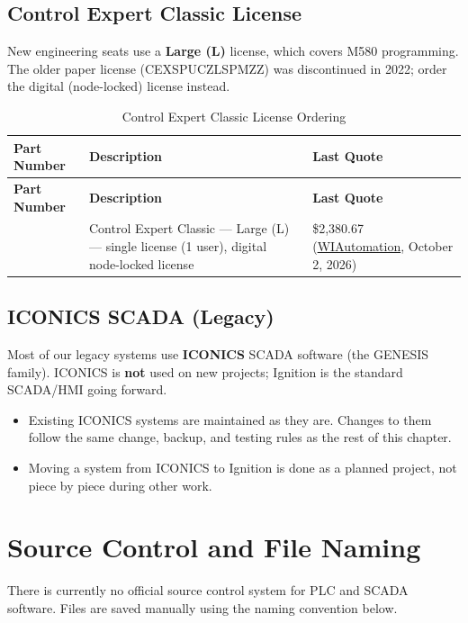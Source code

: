 \subsection{Control Expert Classic License}
New engineering seats use a \textbf{Large (L)} license, which covers M580 programming. The older paper license (CEXSPUCZLSPMZZ) was discontinued in 2022; order the digital (node-locked) license instead.
\begin{longtable}{@{}P{3.90cm}P{8.89cm}P{4.12cm}@{}}
\caption{Control Expert Classic License Ordering}\label{tab:ce-license} \\
\toprule
{}\textbf{Part Number} & \textbf{Description} & \textbf{Last Quote} \\
\midrule
\endfirsthead
\toprule
{}\textbf{Part Number} & \textbf{Description} & \textbf{Last Quote} \\
\midrule
\endhead
{} & Control Expert Classic --- Large (L) --- single license (1 user), digital node-locked license & \$2,380.67 (\href{https://us.wiautomation.com/}{WIAutomation}, October 2, 2026) \\
\bottomrule
\end{longtable}

\subsection{ICONICS SCADA (Legacy)}\label{sec:iconics}
Most of our legacy systems use \textbf{ICONICS} SCADA software (the GENESIS family). ICONICS is \textbf{not} used on new projects; Ignition is the standard SCADA/HMI going forward.
\begin{itemize}[itemsep=1pt]
  \item Existing ICONICS systems are maintained as they are. Changes to them follow the same change, backup, and testing rules as the rest of this chapter.
  \item Moving a system from ICONICS to Ignition is done as a planned project, not piece by piece during other work.
\end{itemize}

\section{Source Control and File Naming}\label{sec:source-control}
There is currently no official source control system for PLC and SCADA software. Files are saved manually using the naming convention below.

